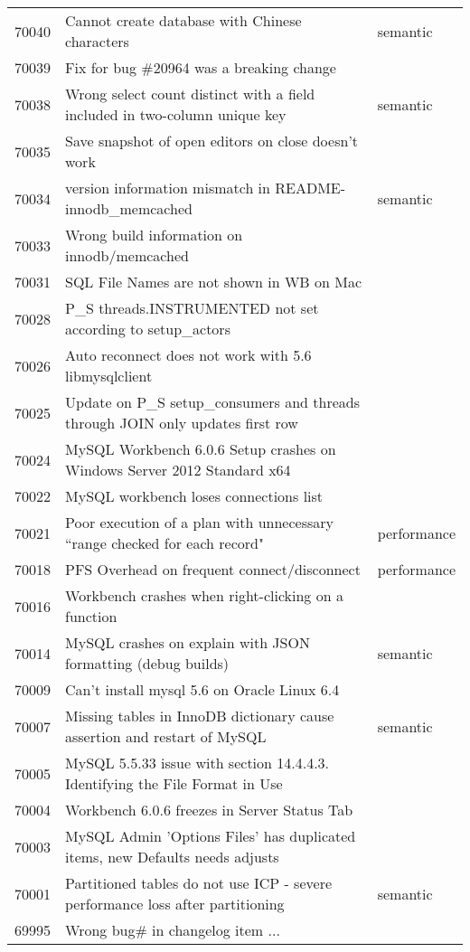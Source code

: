 \begin{longtable}[c]{p{1cm}p{10cm}p{1cm}}
70040 & Cannot create database with Chinese characters & semantic \\
70039 & Fix for bug \#20964 was a breaking change &  \\
70038 & Wrong select count distinct with a field included in two-column unique key & semantic \\
70035 & Save snapshot of open editors on close doesn't work &  \\
70034 & version information mismatch in README-innodb\_memcached & semantic \\
70033 & Wrong build information on innodb/memcached &  \\
70031 & SQL File Names are not shown in WB on Mac &  \\
70028 & P\_S threads.INSTRUMENTED not set according to setup\_actors &  \\
70026 & Auto reconnect does not work with 5.6 libmysqlclient &  \\
70025 & Update on P\_S setup\_consumers and threads through JOIN only updates first row &  \\
70024 & MySQL Workbench 6.0.6 Setup crashes on Windows Server 2012 Standard x64 &  \\
70022 & MySQL workbench loses connections list &  \\
70021 & Poor execution of a plan with unnecessary ``range checked for each record" & performance \\
70018 & PFS Overhead on frequent connect/disconnect & performance \\
70016 & Workbench crashes when right-clicking on a function &  \\
70014 & MySQL crashes on explain with JSON formatting (debug builds) & semantic \\
70009 & Can't install mysql 5.6 on Oracle Linux 6.4 &  \\
70007 & Missing tables in InnoDB dictionary cause assertion and restart of MySQL & semantic \\
70005 & MySQL 5.5.33 issue with section 14.4.4.3. Identifying the File Format in Use &  \\
70004 & Workbench 6.0.6 freezes in Server Status Tab &  \\
70003 & MySQL Admin 'Options Files' has duplicated items, new Defaults needs adjusts &  \\
70001 & Partitioned tables do not use ICP - severe performance loss after partitioning & semantic \\
69995 & Wrong bug\# in changelog item ... &  \\

\end{longtable}
